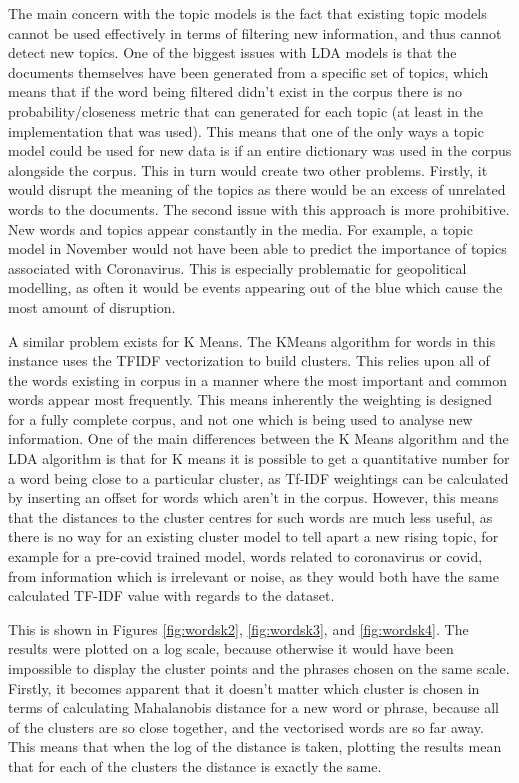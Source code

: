 The main concern with the topic models is the fact that existing topic models cannot be used effectively in terms of filtering new information, and thus cannot detect new topics. One of the biggest issues with LDA models is that the documents themselves have been generated from a specific set of topics, which means that if the word being filtered didn't exist in the corpus there is no probability/closeness metric that can generated for each topic (at least in the implementation that was used). This means that one of the only ways a topic model could be used for new data is if an entire dictionary was used in the corpus alongside the corpus. This in turn would create two other problems. Firstly, it would disrupt the meaning of the topics as there would be an excess of unrelated words to the documents. The second issue with this approach is more prohibitive. New words and topics appear constantly in the media. For example, a topic model in November would not have been able to predict the importance of topics associated with Coronavirus. This is especially problematic for geopolitical modelling, as often it would be events appearing out of the blue which cause the most amount of disruption.  

A similar problem exists for K Means. The KMeans algorithm for words in this instance uses the TFIDF vectorization to build clusters. This relies upon all of the words existing in corpus in a manner where the most important and common words appear most frequently. This means inherently the weighting is designed for a fully complete corpus, and not one which is being used to analyse new information. One of the main differences between the K Means algorithm and the LDA algorithm is that for K means it is possible to get a quantitative number for a word being close to a particular cluster, as Tf-IDF weightings can be calculated by inserting an offset for words which aren't in the corpus. However, this means that the distances to the cluster centres for such words are much less useful, as there is no way for an existing cluster model to tell apart a new rising topic, for example for a pre-covid trained model, words related to coronavirus or covid, from information which is irrelevant or noise, as they would both have the same calculated TF-IDF value with regards to the dataset.

This is shown in Figures \ref{fig:wordsk2}, \ref{fig:wordsk3}, and \ref{fig:wordsk4}. The results were plotted on a log scale, because otherwise it would have been impossible to display the cluster points and the phrases chosen on the same scale. Firstly, it becomes apparent that it doesn't matter which cluster is chosen in terms of calculating Mahalanobis distance for a new word or phrase, because all of the clusters are so close together, and the vectorised words are so far away. This means that when the log of the distance is taken, plotting the results mean that for each of the clusters the distance is exactly the same. 


